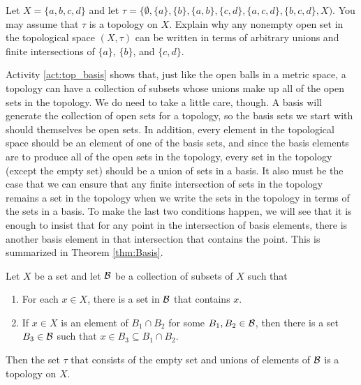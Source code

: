 \begin{activity} \label{act:top_basis} Let $X = \{a,b,c,d\}$ and let $\tau = \{\emptyset, \{a\}, \{b\}, \{a,b\}, \{c,d\}, \{a,c,d\}, \{b,c,d\},X)$. You may assume that $\tau$ is a topology on $X$. Explain why any nonempty open set in the topological space $(X, \tau)$ can be written in terms of arbitrary unions and finite intersections of $\{a\}$, $\{b\}$, and $\{c,d\}$. 

\end{activity}

\begin{comment}

\ActivitySolution By exhaustively looking at every nonempty open set we can see that 
\begin{align*}
\{a\} &= \{a\} \\
\{b\} &= \{b\} \\
\{a,b\} &= \{a\} \cup \{b\} \\
\{c,d\} &= \{c,d\} \\
\{a,c,d\} &= \{a\} \cup \{c,d\} \\
X &=  \{a\} \cup \{b\} \cup \{c,d\}.
\end{align*}

\end{comment}

Activity \ref{act:top_basis} shows that, just like the open balls in a metric space, a topology can have a collection of subsets whose unions make up all of the open sets in the topology. We do need to take a little care, though. A basis will generate the collection of open sets for a topology, so the basis sets we start with should themselves be open sets. In addition, every element in the topological space should be an element of one of the basis sets, and since the basis elements are to produce all of the open sets in the topology, every set in the topology (except the empty set) should be a union of sets in a basis. It also must be the case that we can ensure that any finite intersection of sets in the topology remains a set in the topology when we write the sets in the topology in terms of the sets in a basis. To make the last two conditions happen, we will see that it is enough to insist that for any point in the intersection of basis elements, there is another basis element in that intersection that contains the point. This is summarized in Theorem \ref{thm:Basis}.  

\begin{theorem} \label{thm:Basis} Let $X$ be a set and let $\mathcal{B}$ be a collection of subsets of $X$ such that 
\begin{enumerate}
\item For each $x \in X$, there is a set in $\mathcal{B}$ that contains $x$.
\item If $x \in X$ is an element of $B_1 \cap B_2$ for some $B_1, B_2 \in \mathcal{B}$, then there is a set $B_3 \in \mathcal{B}$ such that $x \in B_3 \subseteq B_1 \cap B_2$. 
\end{enumerate}
Then the set $\tau$ that consists of the empty set and unions of elements of $\mathcal{B}$ is a topology on $X$.  
\end{theorem}

